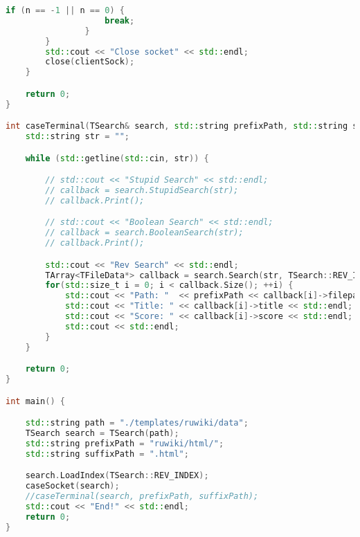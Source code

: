 \begin{lstlisting}[language=C++]
                if (n == -1 || n == 0) {
                    break;
                }
        }
        std::cout << "Close socket" << std::endl;
        close(clientSock);
    }

    return 0;
}

int caseTerminal(TSearch& search, std::string prefixPath, std::string suffixPath) {
    std::string str = "";

    while (std::getline(std::cin, str)) {

        // std::cout << "Stupid Search" << std::endl;
        // callback = search.StupidSearch(str);
        // callback.Print();

        // std::cout << "Boolean Search" << std::endl;
        // callback = search.BooleanSearch(str);
        // callback.Print();

        std::cout << "Rev Search" << std::endl;
        TArray<TFileData*> callback = search.Search(str, TSearch::REV_INDEX);
        for(std::size_t i = 0; i < callback.Size(); ++i) {
            std::cout << "Path: "  << prefixPath << callback[i]->filepath << suffixPath << std::endl;
            std::cout << "Title: " << callback[i]->title << std::endl;
            std::cout << "Score: " << callback[i]->score << std::endl;
            std::cout << std::endl;
        }
    }

    return 0;
}

int main() {

    std::string path = "./templates/ruwiki/data";
    TSearch search = TSearch(path);
    std::string prefixPath = "ruwiki/html/";
    std::string suffixPath = ".html";

    search.LoadIndex(TSearch::REV_INDEX);
    caseSocket(search);
    //caseTerminal(search, prefixPath, suffixPath);
    std::cout << "End!" << std::endl;
    return 0;
}
\end{lstlisting}

